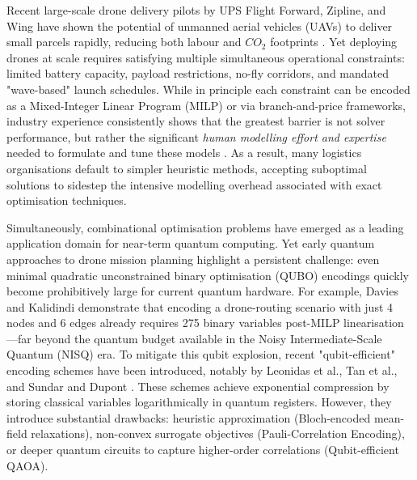 Recent large-scale drone delivery pilots by UPS Flight Forward, Zipline, and Wing have shown the potential of unmanned aerial vehicles (UAVs) to deliver small parcels rapidly, reducing both labour and $CO_2$ footprints \cite{murray2020survey}. Yet deploying drones at scale requires satisfying multiple simultaneous operational constraints: limited battery capacity, payload restrictions, no-fly corridors, and mandated "wave-based" launch schedules. While in principle each constraint can be encoded as a Mixed-Integer Linear Program (MILP) or via branch-and-price frameworks, industry experience consistently shows that the greatest barrier is not solver performance, but rather the significant \emph{human modelling effort and expertise} needed to formulate and tune these models \cite{bangert2012industrial,rossi2006hcp}. As a result, many logistics organisations default to simpler heuristic methods, accepting suboptimal solutions to sidestep the intensive modelling overhead associated with exact optimisation techniques.

Simultaneously, combinational optimisation problems have emerged as a leading application domain for near-term quantum computing. Yet early quantum approaches to drone mission planning highlight a persistent challenge: even minimal quadratic unconstrained binary optimisation (QUBO) encodings quickly become prohibitively large for current quantum hardware. For example, Davies and Kalidindi \cite{davies_quantum_2024} demonstrate that encoding a drone-routing scenario with just 4 nodes and 6 edges already requires 275 binary variables post-MILP linearisation—far beyond the quantum budget available in the Noisy Intermediate-Scale Quantum (NISQ) era. To mitigate this qubit explosion, recent "qubit-efficient" encoding schemes have been introduced, notably by Leonidas et al.\cite{leonidas2024qubovrp}, Tan et al.\cite{tan_qubit-efficient_2021}, and Sundar and Dupont \cite{sundar_qubit-efficient_2024}. These schemes achieve exponential compression by storing classical variables logarithmically in quantum registers. However, they introduce substantial drawbacks: heuristic approximation (Bloch-encoded mean-field relaxations), non-convex surrogate objectives (Pauli-Correlation Encoding), or deeper quantum circuits to capture higher-order correlations (Qubit-efficient QAOA).

